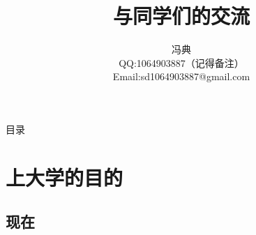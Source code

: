 \documentclass[UTF8]{ctexbeamer}
\title[与同学们的交流] %
{与同学们的交流}
\subtitle
{} %
\author[冯典] %
{冯典\\
QQ:1064903887（记得备注）\\
Email:sd1064903887@gmail.com }
\institute[Universities of Somewhere and Elsewhere] %
{
 
  数学与计算科学学院\\
  湘潭大学
}
\date[Short Occasion] %
{}
\begin{document}
\begin{frame}
  \titlepage
\end{frame}

\begin{frame}{目录}
  \tableofcontents
\end{frame}




\section{上大学的目的}

\subsection[现在]{现在}
\end{document}
